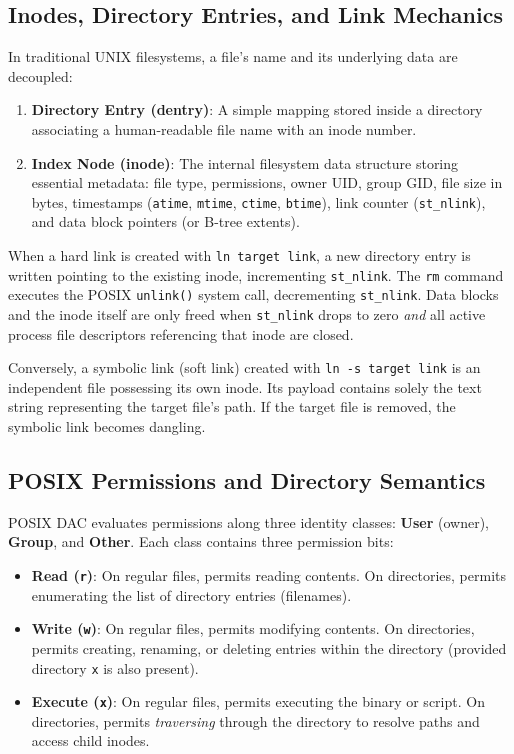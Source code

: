 \documentclass[12pt,a4paper]{article}
\begin{document}
\subsection{Inodes, Directory Entries, and Link Mechanics}
In traditional UNIX filesystems, a file's name and its underlying data are decoupled:
\begin{enumerate}
    \item \textbf{Directory Entry (dentry)}: A simple mapping stored inside a directory associating a human-readable file name with an inode number.
    \item \textbf{Index Node (inode)}: The internal filesystem data structure storing essential metadata: file type, permissions, owner UID, group GID, file size in bytes, timestamps (\texttt{atime}, \texttt{mtime}, \texttt{ctime}, \texttt{btime}), link counter (\texttt{st\_nlink}), and data block pointers (or B-tree extents).
\end{enumerate}

When a hard link is created with \texttt{ln target link}, a new directory entry is written pointing to the existing inode, incrementing \texttt{st\_nlink}. The \texttt{rm} command executes the POSIX \texttt{unlink()} system call, decrementing \texttt{st\_nlink}. Data blocks and the inode itself are only freed when \texttt{st\_nlink} drops to zero \emph{and} all active process file descriptors referencing that inode are closed.

Conversely, a symbolic link (soft link) created with \texttt{ln -s target link} is an independent file possessing its own inode. Its payload contains solely the text string representing the target file's path. If the target file is removed, the symbolic link becomes dangling.

\subsection{POSIX Permissions and Directory Semantics}
POSIX DAC evaluates permissions along three identity classes: \textbf{User} (owner), \textbf{Group}, and \textbf{Other}. Each class contains three permission bits:
\begin{itemize}
    \item \textbf{Read (\texttt{r})}: On regular files, permits reading contents. On directories, permits enumerating the list of directory entries (filenames).
    \item \textbf{Write (\texttt{w})}: On regular files, permits modifying contents. On directories, permits creating, renaming, or deleting entries within the directory (provided directory \texttt{x} is also present).
    \item \textbf{Execute (\texttt{x})}: On regular files, permits executing the binary or script. On directories, permits \emph{traversing} through the directory to resolve paths and access child inodes.
\end{itemize}
\end{document}

